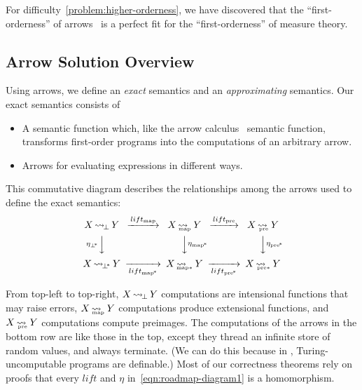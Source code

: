 \documentclass{llncs}
\newcommand{\arrow}{\rightsquigarrow}
\newcommand{\arrowlift}{\ensuremath{lift}}
\newcommand{\arrowtrans}{\ensuremath{\eta}}
\DeclareMathOperator{\botto}{\arrow_{\mspace{-3mu}\bot}}
\newcommand{\map}{_\mathrm{map}}
\DeclareMathOperator{\mapto}{\arrow_{\mspace{-21mu}\map}}
\newcommand{\liftmap}{\arrowlift\map}
\newcommand{\pre}{_\mathrm{pre}}
\DeclareMathOperator{\preto}{\arrow_{\mspace{-19mu}\pre}}
\newcommand{\liftpre}{\arrowlift\pre}
\newcommand{\pbot}{{\bot^{\mspace{-4mu}*}}}
\DeclareMathOperator{\pbotto}{\arrow_{\mspace{-3mu}\pbot}}
\newcommand{\pmap}{_\mathrm{map^{\mspace{-2mu}*}}}
\DeclareMathOperator{\pmapto}{\arrow_{\mspace{-22mu}_{\mathrm{map*}}}}
\newcommand{\liftpmap}{\arrowlift\pmap}
\newcommand{\ppre}{_\mathrm{pre^{\mspace{-2mu}*}}}
\DeclareMathOperator{\ppreto}{\arrow_{\mspace{-19mu}_{\mathrm{pre*}}}}
\newcommand{\liftppre}{\arrowlift\ppre}
\begin{document}
For difficulty~\ref{problem:higher-orderness}, we have discovered that the ``first-orderness'' of arrows~\cite{cit:hughes-2000scp-arrows} is a perfect fit for the ``first-orderness'' of measure theory.


\subsection{Arrow Solution Overview}

\newcommand{\youarehere}[1]%
{%
\begin{equation}%
\begin{CD}%
X \botto Y   @>\liftmap>>   X \mapto Y   @>\liftpre>>   X \preto Y \\%
@V{\eta_\pbot}VV             @VV{\eta\pmap}V              @VV{\eta\ppre}V\\%
X \pbotto Y  @>>\liftpmap>  X \pmapto Y  @>>\liftppre>  X \ppreto Y%
\end{CD}%
\label{#1}%
\end{equation}%
}

Using arrows, we define an \emph{exact} semantics and an \emph{approximating} semantics.
Our exact semantics consists of
\begin{itemize}
	\item A semantic function which, like the arrow calculus~\cite{cit:lindley-2010jfp-arrow-calculus} semantic function, transforms first-order programs into the computations of an arbitrary arrow.
	\item Arrows for evaluating expressions in different ways.
\end{itemize}
This commutative diagram describes the relationships among the arrows used to define the exact semantics:
\youarehere{eqn:roadmap-diagram1}
From top-left to top-right, $X \botto Y$ computations are intensional functions that may raise errors, $X \mapto Y$ computations produce extensional functions, and $X \preto Y$ computations compute preimages.
The computations of the arrows in the bottom row are like those in the top, except they thread an infinite store of random values, and always terminate.
(We can do this because in \lzfclang, Turing-uncomputable programs are definable.)
Most of our correctness theorems rely on proofs that every $\arrowlift$ and $\arrowtrans$ in~\eqref{eqn:roadmap-diagram1} is a homomorphism.
\end{document}
